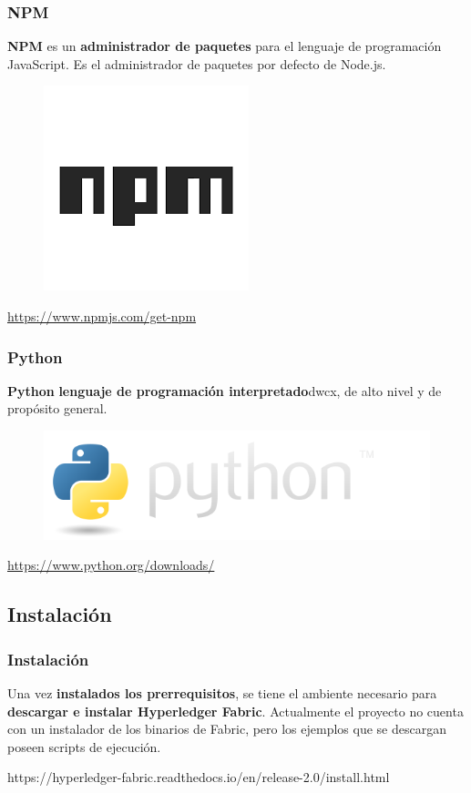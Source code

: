 \documentclass{beamer}
\begin{document}
	\begin{frame}
		\frametitle{NPM}
		\textbf{NPM} es un \textbf{administrador de paquetes} para el lenguaje de programación JavaScript. Es el administrador de paquetes por defecto de Node.js.
		\begin{figure}[h]
			\includegraphics[scale=.3]{npm}
			\centering
		\end{figure}
		\begin{center}
			\tiny{\url{https://www.npmjs.com/get-npm}}
		\end{center}
	\end{frame}
	
	\begin{frame}
		\frametitle{Python}
		\textbf{Python} \textbf{lenguaje de programación interpretado}dwcx, de alto nivel y de propósito general.
		\begin{figure}[h]
			\includegraphics[scale=.3]{python}
			\centering
		\end{figure}
		\begin{center}
			\tiny{\url{https://www.python.org/downloads/}}
		\end{center}
	\end{frame}

	\subsection{Instalación}
	
	\begin{frame}
		\frametitle{Instalación}
		Una vez \textbf{instalados los prerrequisitos}, se tiene el ambiente necesario para \textbf{descargar e instalar Hyperledger Fabric}. Actualmente el proyecto no cuenta con un instalador de los binarios de Fabric, pero los ejemplos que se descargan poseen scripts de ejecución.
		\begin{center}
			\tiny{https://hyperledger-fabric.readthedocs.io/en/release-2.0/install.html}
		\end{center}
	\end{frame}
	
\end{document}
